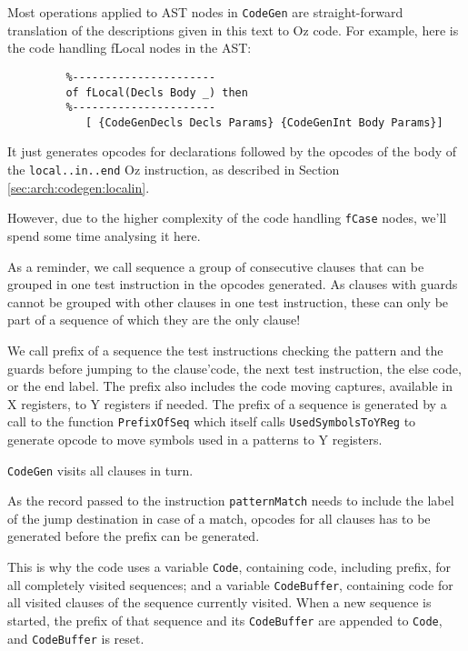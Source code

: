 \documentclass[a4paper]{memoir}
\begin{document}
Most operations applied to AST nodes in \lstinline!CodeGen! are straight-forward translation of the
descriptions given in this text to Oz code. For example, here is the
code handling fLocal nodes in the AST:

\begin{lstlisting}
         %----------------------
         of fLocal(Decls Body _) then
         %----------------------
            [ {CodeGenDecls Decls Params} {CodeGenInt Body Params}]
\end{lstlisting}

It just generates opcodes for declarations followed by the opcodes of the body
of the \lstinline!local..in..end! Oz instruction, as described in Section
\ref{sec:arch:codegen:localin}.

However, due to the higher complexity of the code handling \lstinline!fCase! nodes, we'll
spend some time analysing it here.

As a reminder, we call sequence a group of consecutive clauses that can be
grouped in one test instruction in the opcodes generated. As clauses with guards
cannot be grouped with other clauses in one test instruction, these
can only be part of a sequence of which they are the only clause!

We call prefix of a sequence the test
instructions checking the pattern and the guards before jumping to the
clause'code, the next test instruction, the else code, or the end label.
The prefix also includes the code moving captures, available in X registers,
to Y registers if needed.
The prefix of a sequence is generated by a call to the function
\lstinline!PrefixOfSeq! which itself calls \lstinline!UsedSymbolsToYReg! to
generate opcode to move symbols used in a patterns to Y registers.

\lstinline!CodeGen! visits all clauses in turn.

As the record passed to the instruction \lstinline!patternMatch! needs to
include the label of the jump destination in case of a match, opcodes for all
clauses has to be generated before the prefix can be generated.

This is why the code uses a variable \lstinline!Code!, containing code,
including prefix, for all completely visited sequences; and a variable
\lstinline!CodeBuffer!, containing code for all visited clauses of the sequence
currently visited. When a new sequence is started, the prefix of that sequence
and its \lstinline!CodeBuffer! are appended to \lstinline!Code!, and
\lstinline!CodeBuffer! is reset.
\end{document}
